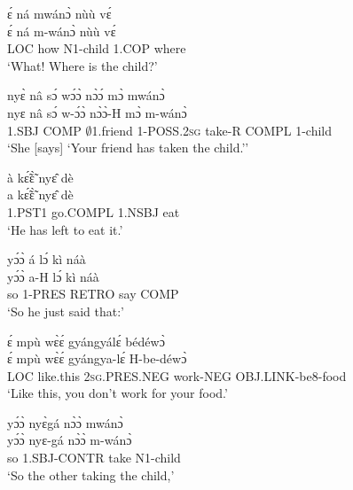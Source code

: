 \begin{exe} 
\exN\label{93}
  \glll ɛ́ ná mwánɔ̀ nùù vɛ́ \\
       ɛ́ ná m-wánɔ̀ nùù vɛ́ \\
       LOC how N1-child 1.COP where  \\
    \trans `What! Where is the child?'
\end{exe}

\begin{exe} 
\exN\label{94}
  \glll nyɛ̀ nâ sɔ́ wɔ́ɔ̀ nɔ̀ɔ́ mɔ̀ mwánɔ̀ \\
        nyɛ nâ sɔ́ w-ɔ́ɔ̀ nɔ̀ɔ̀-H mɔ̀ m-wánɔ̀ \\
      1.SBJ COMP $\emptyset$1.friend 1-POSS.2\textsc{sg} take-R COMPL 1-child   \\
    \trans `She [says] `Your friend has taken the child.''
\end{exe}

\begin{exe} 
\exN\label{95} 
  \glll à kɛ̃́ɛ̃̀ nyɛ̂ dè \\
       a kɛ̃́ɛ̃̀ nyɛ̂ dè \\
       1.PST1 go.COMPL 1.NSBJ eat \\
    \trans `He has left to eat it.'
\end{exe}

\begin{exe} 
\exN\label{96}
  \glll yɔ́ɔ̀ á lɔ́ kì náà \\
        yɔ́ɔ̀ a-H lɔ́ kì náà \\
        so 1-PRES RETRO say COMP \\
    \trans `So he just said that:'
\end{exe}

\begin{exe} 
\exN\label{97}
  \glll ɛ́ mpù wɛ̀ɛ́ gyángyálɛ́ bédéwɔ̀ \\
       ɛ́ mpù wɛ̀ɛ́ gyángya-lɛ́ H-be-déwɔ̀ \\
        LOC like.this 2\textsc{sg}.PRES.NEG work-NEG OBJ.LINK-be8-food \\
    \trans `Like this, you don't work for your food.'
\end{exe}

\begin{exe} 
\exN\label{98}
  \glll yɔ́ɔ̀ nyɛ̀gá nɔ̀ɔ̀ mwánɔ̀ \\
        yɔ́ɔ̀ nyɛ-gá nɔ̀ɔ̀ m-wánɔ̀ \\
       so 1.SBJ-CONTR take N1-child  \\
    \trans `So the other taking the child,'
\end{exe}

